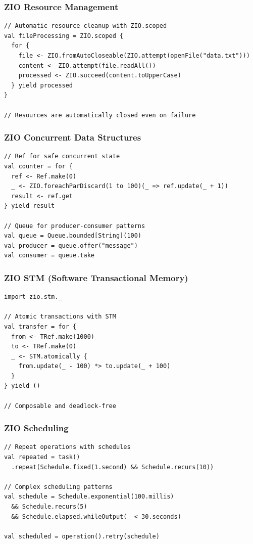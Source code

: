 \documentclass{beamer}
\begin{document}
\begin{frame}[fragile]
\frametitle{ZIO Resource Management}

\begin{lstlisting}[style=scalaStyle]
// Automatic resource cleanup with ZIO.scoped
val fileProcessing = ZIO.scoped {
  for {
    file <- ZIO.fromAutoCloseable(ZIO.attempt(openFile("data.txt")))
    content <- ZIO.attempt(file.readAll())
    processed <- ZIO.succeed(content.toUpperCase)
  } yield processed
}

// Resources are automatically closed even on failure
\end{lstlisting}

\end{frame}

\begin{frame}[fragile]
\frametitle{ZIO Concurrent Data Structures}

\begin{lstlisting}[style=scalaStyle]
// Ref for safe concurrent state
val counter = for {
  ref <- Ref.make(0)
  _ <- ZIO.foreachParDiscard(1 to 100)(_ => ref.update(_ + 1))
  result <- ref.get
} yield result

// Queue for producer-consumer patterns
val queue = Queue.bounded[String](100)
val producer = queue.offer("message")
val consumer = queue.take
\end{lstlisting}

\end{frame}

\begin{frame}[fragile]
\frametitle{ZIO STM (Software Transactional Memory)}

\begin{lstlisting}[style=scalaStyle]
import zio.stm._

// Atomic transactions with STM
val transfer = for {
  from <- TRef.make(1000)
  to <- TRef.make(0)
  _ <- STM.atomically {
    from.update(_ - 100) *> to.update(_ + 100)
  }
} yield ()

// Composable and deadlock-free
\end{lstlisting}

\end{frame}

\begin{frame}[fragile]
\frametitle{ZIO Scheduling}

\begin{lstlisting}[style=scalaStyle]
// Repeat operations with schedules
val repeated = task()
  .repeat(Schedule.fixed(1.second) && Schedule.recurs(10))

// Complex scheduling patterns
val schedule = Schedule.exponential(100.millis) 
  && Schedule.recurs(5) 
  && Schedule.elapsed.whileOutput(_ < 30.seconds)

val scheduled = operation().retry(schedule)
\end{lstlisting}

\end{frame}
\end{document}
